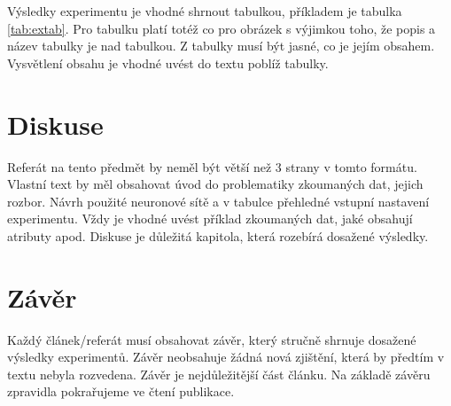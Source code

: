 \documentclass[journal]{IEEEtrancz}
\begin{document}
Výsledky experimentu je vhodné shrnout tabulkou, příkladem
je tabulka \ref{tab:extab}. Pro tabulku platí totéž co 
pro obrázek s výjimkou toho, že popis a název tabulky je nad tabulkou. Z tabulky
musí být jasné, co je jejím obsahem. Vysvětlení obsahu je vhodné uvést 
do textu poblíž tabulky.

\section{Diskuse}
Referát na tento předmět by neměl být větší než 3 strany v tomto formátu. 
Vlastní text by měl obsahovat úvod do problematiky zkoumaných dat, jejich rozbor. Návrh
použité neuronové sítě a v tabulce přehledné vstupní nastavení experimentu. Vždy je vhodné
uvést příklad zkoumaných dat, jaké obsahují atributy apod. Diskuse je důležitá kapitola,
která rozebírá dosažené výsledky. 

\section{Závěr}
Každý článek/referát musí obsahovat závěr, který stručně shrnuje dosažené výsledky 
experimentů. Závěr neobsahuje žádná nová zjištění, která by předtím v textu nebyla rozvedena.
Závěr je nejdůležitější část článku. Na základě závěru zpravidla pokrařujeme ve čtení
publikace. 
\end{document}
